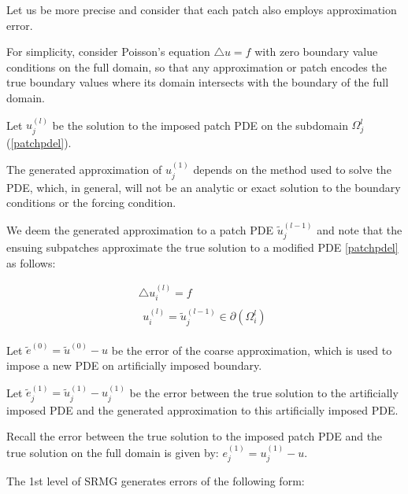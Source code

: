 \documentclass[final]{siamart1116}
\numberwithin{theorem}{section}
\begin{document}
Let us be more precise and consider that each patch also employs approximation error.

For simplicity, consider Poisson's equation $\bigtriangleup u = f$ with zero boundary value conditions on the full domain, so that any approximation or patch encodes the true boundary values where its domain  intersects with the boundary of the full domain. %

Let $u^{(l)}_j$ be the solution to the imposed patch PDE on the subdomain $\Omega^{l}_j$ (\ref{patchpdel}). 

The generated approximation of $u^{(1)}_j$ depends on the method used to solve the PDE, which, in general, will not be an analytic or exact solution to the boundary conditions or the forcing condition. 

We deem the generated approximation to a patch PDE $\tilde{u}^{(l-1)}_j$ and note that the ensuing subpatches approximate the true solution to a modified PDE \ref{patchpdel} as follows:

\begin{gather*}
  \bigtriangleup u^{(l)}_i = f  \\
  \begin{split}
    u^{(l)}_i = \tilde{u}^{(l-1)}_j \in \partial (\Omega^{l}_i) 
  \end{split}
\end{gather*}


Let $\tilde{e}^{(0)} = \tilde{u}^{(0)} - u$ be the 
error of the coarse approximation, which is used to impose a new PDE on artificially imposed boundary.




Let $\tilde{e}^{(1)}_j = \tilde{u}^{(1)}_j - u^{(1)}_j$ be the error between the true solution to the artificially imposed PDE and the generated approximation to this artificially imposed PDE. 

Recall the error between the true solution to the imposed patch PDE and the true solution on the full domain is given by: $e^{(1)}_j = u^{(1)}_j - u$.

The 1st level of SRMG generates errors of the following form:
\end{document}
